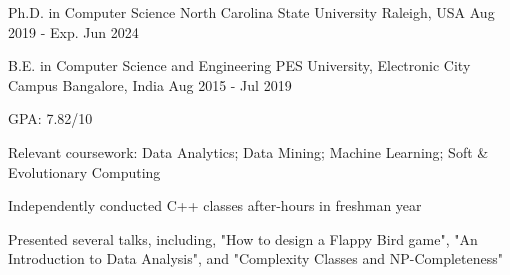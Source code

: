 

\begin{cventries}

  \cventry
    {Ph.D. in Computer Science} %
    {North Carolina State University} %
    {Raleigh, USA} %
    {Aug 2019 - Exp. Jun 2024} %
    {
    }

  \cventry
    {B.E. in Computer Science and Engineering} %
    {PES University, Electronic City Campus} %
    {Bangalore, India} %
    {Aug 2015 - Jul 2019} %
    {
      \begin{cvitems} %
        \item {GPA: 7.82/10}
        \item {Relevant coursework: Data Analytics; Data Mining; Machine Learning; Soft \& Evolutionary Computing}
        \item {Independently conducted C++ classes after-hours in freshman year}
        \item {Presented several talks, including, "How to design a Flappy Bird game", "An Introduction to Data Analysis", and "Complexity Classes and NP-Completeness"}
      \end{cvitems}
    }

\end{cventries}
